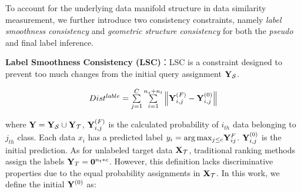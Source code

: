 \documentclass[journal,twocolumn]{IEEEtran}
\newcommand\luo[1]{{\footnotesize \color{blue}[#1 - \textbf{Luo}]}}
\begin{document}
\begin{CJK*}{UTF8}{gkai}

To account for the underlying data manifold structure in data similarity measurement, we further introduce two consistency constraints, namely \textit{label smoothness consistency} and \textit{geometric structure consistency} for both the \emph{pseudo} and final label inference. 
						
						
						





					
\textbf{Label Smoothness Consistency (LSC)}：LSC is a constraint designed to prevent too much changes from the initial query assignment ${{\bf{Y}}_{\cal S}}$.

						
\begin{equation}\label{eq:labelconsitency}
	\begin{array}{c}
Dis{t^{lable}} = \sum\limits_{j = 1}^C {\mathop \sum \limits_{i = 1}^{{n_s} + {n_t}} } \left\| {\bf{Y}}^{(F)}_{i,j}-{\bf{Y}}^{(0)}_{i,j} \right\|
	\end{array}
\end{equation}
						
						
						
where ${\bf{Y}} = {{\bf{Y}}_{\cal S}} \cup {{\bf{Y}}_{\cal T}}$,  ${\bf{Y}}_{i,j}^{(F)}$ is the calculated probability of ${i_{th}}$ data belonging to ${j_{th}}$ class. Each data ${x_i}$ has a predicted label ${y_i} = \arg {\max _{j \le c}}{\bf{Y}}_{ij}^F$. ${\bf{Y}}_{i,j}^{(0)}$ is the initial prediction. As for unlabeled target data ${{\bf{X}}_{\cal T}}$,  traditional ranking methods\cite{6341755,6619251} assign the labels ${{\bf{Y}}_T} = {{\bf{0}}^{{n_t}*c}}$. However, this definition lacks  discriminative properties due to the equal probability assignments in ${{\bf{X}}_{\cal T}}$. In this work, we define the initial ${{\bf{Y}}^{(0)}}$ as:


\end{CJK*}
\end{document}
